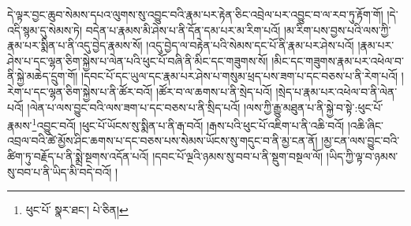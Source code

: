 དེ་ལྟར་བྱང་ཆུབ་སེམས་དཔའ་ལུགས་སུ་འབྱུང་བའི་རྣམ་པར་རྟེན་ཅིང་འབྲེལ་པར་འབྱུང་བ་ལ་རབ་ཏུ་རྟོག་གོ། །དེ་འདི་སྙམ་དུ་སེམས་ཏེ། བདེན་པ་རྣམས་མི་ཤེས་པ་ནི་དོན་དམ་པར་མ་རིག་པའོ། །མ་རིག་པས་བྱས་པའི་ལས་ཀྱི་རྣམ་པར་སྨིན་པ་ནི་འདུ་བྱེད་རྣམས་སོ། །འདུ་བྱེད་ལ་བརྟེན་པའི་སེམས་དང་པོ་ནི་རྣམ་པར་ཤེས་པའོ། །རྣམ་པར་ཤེས་པ་དང་ལྷན་ཅིག་སྐྱེས་པ་ལེན་པའི་ཕུང་པོ་བཞི་ནི་མིང་དང་གཟུགས་སོ། །མིང་དང་གཟུགས་རྣམ་པར་འཕེལ་བ་ནི་སྐྱེ་མཆེད་དྲུག་གོ། །དབང་པོ་དང་ཡུལ་དང་རྣམ་པར་ཤེས་པ་གསུམ་ཕྲད་པས་ཟག་པ་དང་བཅས་པ་ནི་རེག་པའོ། །རེག་པ་དང་ལྷན་ཅིག་སྐྱེས་པ་ནི་ཚོར་བའོ། །ཚོར་བ་ལ་ཆགས་པ་ནི་སྲེད་པའོ། །སྲེད་པ་རྣམ་པར་འཕེལ་བ་ནི་ལེན་པའོ། །ལེན་པ་ལས་བྱུང་བའི་ལས་ཟག་པ་དང་བཅས་པ་ནི་སྲིད་པའོ། །ལས་ཀྱི་རྒྱུ་མཐུན་པ་ནི་སྐྱེ་བ་སྟེ་:ཕུང་པོ་རྣམས་\footnote{ཕུང་པོ་  སྣར་ཐང་།  པེ་ཅིན། }འབྱུང་བའོ། །ཕུང་པོ་ཡོངས་སུ་སྨིན་པ་ནི་རྒ་བའོ། །རྒས་པའི་ཕུང་པོ་འཇིག་པ་ནི་འཆི་བའོ། །འཆི་ཞིང་འབྲལ་བའི་ཚེ་མྱོས་ཤིང་ཆགས་པ་དང་བཅས་པས་སེམས་ཡོངས་སུ་གདུང་བ་ནི་མྱ་ངན་ནོ། །མྱ་ངན་ལས་བྱུང་བའི་ཚིག་ཏུ་བརྗོད་པ་ནི་སྨྲེ་སྔགས་འདོན་པའོ། །དབང་པོ་ལྔའི་ཉམས་སུ་བབ་པ་ནི་སྡུག་བསྔལ་ལོ། །ཡིད་ཀྱི་ལྟ་བ་ཉམས་སུ་བབ་པ་ནི་ཡིད་མི་བདེ་བའོ། །
